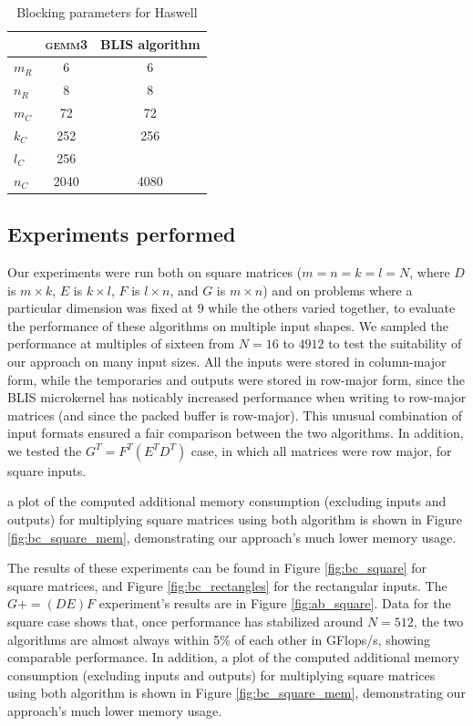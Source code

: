 \documentclass[12pt]{article}
\newcommand*{\pluseq}{\mathrel{{+}{=}}}
\newcommand*{\gemmt}{{\textsc{gemm3}}}
\begin{document}
\begin{table}
  \centering
  \begin{tabular}{l|c c}
    &\gemmt{}&BLIS algorithm\\ \hline
    $m_R$&6&6\\
    $n_R$&8&8\\
    $m_C$&72&72\\
    $k_C$&252&256\\
    $l_C$&256&\\
    $n_C$&2040&4080\\
  \end{tabular}
  \caption{Blocking parameters for Haswell}
  \label{tab:parameters}
\end{table}

\subsection{Experiments performed}
Our experiments were run both on square matrices ($m = n = k = l = N$, where $D$ is $m \times k$, $E$ is $k \times l$, $F$ is $l \times n$, and $G$ is $m \times n$) and on problems where a particular dimension was fixed at $9$ while the others varied together, to evaluate the performance of these algorithms on multiple input shapes.
We sampled the performance at multiples of sixteen from $N = 16$ to $4912$ to test the suitability of our approach on many input sizes.
All the inputs were stored in column-major form, while the temporaries and outputs were stored in row-major form, since the BLIS microkernel has noticably increased performance when writing to row-major matrices (and since the packed buffer is row-major).
This unusual combination of input formats ensured a fair comparison between the two algorithms.
In addition, we tested the $G^T = F^T(E^TD^T)$ case, in which all matrices were row major, for square inputs.

a plot of the computed additional memory consumption (excluding inputs and outputs) for multiplying square matrices using both algorithm is shown in Figure \ref{fig:bc_square_mem}, demonstrating our approach's much lower memory usage.

The results of these experiments can be found in Figure \ref{fig:bc_square} for square matrices, and Figure \ref{fig:bc_rectangles} for the rectangular inputs.
The $G \pluseq (DE)F$ experiment's results are in Figure \ref{fig:ab_square}.
Data for the square case shows that, once performance has stabilized around $N = 512$, the two algorithms are almost always within 5\% of each other in GFlops/s, showing comparable performance.
In addition, a plot of the computed additional memory consumption (excluding inputs and outputs) for multiplying square matrices using both algorithm is shown in Figure \ref{fig:bc_square_mem}, demonstrating our approach's much lower memory usage.
\end{document}
